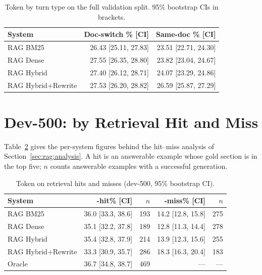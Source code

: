 \begin{table}[ht]
    \centering
    \caption{Token \fone{} by turn type on the full validation split.
             95\% bootstrap CIs in brackets.}
    \label{tab:log:docswitch_f1}
    \begin{tabular}{lrr}
        \toprule
        System & Doc-switch \fone{}\% [CI] & Same-doc \fone{}\% [CI] \\
        \midrule
        RAG BM25           & 26.43 [25.11, 27.83] & 23.51 [22.71, 24.30] \\
        RAG Dense          & 27.55 [26.35, 28.80] & 23.82 [23.04, 24.67] \\
        RAG Hybrid         & 27.40 [26.12, 28.71] & 24.07 [23.29, 24.86] \\
        RAG Hybrid+Rewrite & 27.53 [26.20, 28.82] & 26.59 [25.87, 27.29] \\
        \bottomrule
    \end{tabular}
\end{table}


\section{Dev-500: \fone{} by Retrieval Hit and Miss}\label{ax:log:hitmiss}

Table~\ref{tab:log:hitmiss} gives the per-system figures behind the hit--miss
analysis of Section~\ref{sec:rag:analysis}. A hit is an answerable example whose gold
section is in the top five; $n$ counts answerable examples with a successful
generation.

\begin{table}[ht]
    \centering
    \caption{Token \fone{} on retrieval hits and misses (dev-500, 95\% bootstrap CI).}
    \label{tab:log:hitmiss}
    \begin{tabular}{lrrrr}
        \toprule
        System & \fone{}-hit\% [CI] & $n$ & \fone{}-miss\% [CI] & $n$ \\
        \midrule
        RAG BM25           & 36.0 [33.3, 38.6] & 193 & 14.2 [12.8, 15.8] & 275 \\
        RAG Dense          & 35.1 [32.2, 37.8] & 189 & 12.8 [11.3, 14.4] & 278 \\
        RAG Hybrid         & 35.4 [32.8, 37.9] & 214 & 13.9 [12.3, 15.6] & 255 \\
        RAG Hybrid+Rewrite & 33.3 [30.9, 35.7] & 286 & 18.3 [16.3, 20.4] & 183 \\
        Oracle             & 36.7 [34.8, 38.7] & 469 & ---               & --- \\
        \bottomrule
    \end{tabular}
\end{table}


